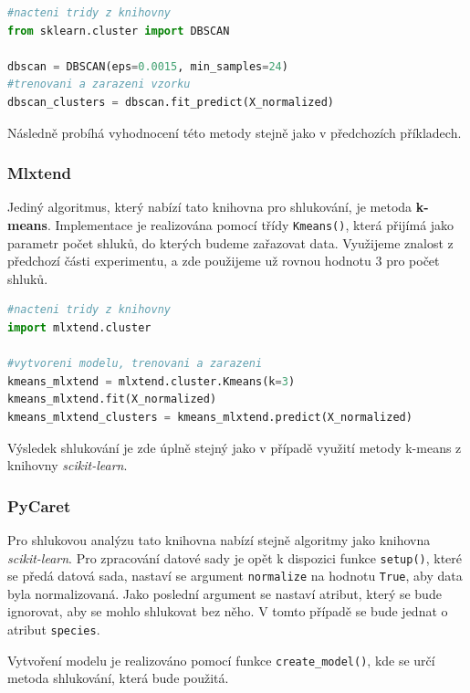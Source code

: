 \begin{mdframed}
\begin{lstlisting}[language=Python]
#nacteni tridy z knihovny
from sklearn.cluster import DBSCAN

dbscan = DBSCAN(eps=0.0015, min_samples=24)
#trenovani a zarazeni vzorku
dbscan_clusters = dbscan.fit_predict(X_normalized)
\end{lstlisting}   
\end{mdframed}
Následně probíhá vyhodnocení této metody stejně jako v předchozích příkladech.

\subsubsection*{Mlxtend}
Jediný algoritmus, který nabízí tato knihovna pro shlukování, je metoda \textbf{k-means}. Implementace je realizována pomocí třídy \verb|Kmeans()|, která přijímá jako parametr počet shluků, do kterých budeme zařazovat data. Využijeme znalost z předchozí části experimentu, a zde použijeme už rovnou hodnotu 3 pro počet shluků. 

\begin{mdframed}
\begin{lstlisting}[language=Python]
#nacteni tridy z knihovny
import mlxtend.cluster

#vytvoreni modelu, trenovani a zarazeni
kmeans_mlxtend = mlxtend.cluster.Kmeans(k=3)
kmeans_mlxtend.fit(X_normalized)
kmeans_mlxtend_clusters = kmeans_mlxtend.predict(X_normalized)
\end{lstlisting}   
\end{mdframed}

Výsledek shlukování je zde úplně stejný jako v případě využití metody k-means z knihovny \textit{scikit-learn}.

\subsubsection*{PyCaret}
Pro shlukovou analýzu tato knihovna nabízí stejně algoritmy jako knihovna \textit{scikit-learn}. Pro zpracování datové sady je opět k dispozici funkce \verb|setup()|, které se předá datová sada, nastaví se argument \verb|normalize| na hodnotu \verb|True|, aby data byla normalizovaná. Jako poslední argument se nastaví
atribut, který se bude ignorovat, aby se mohlo shlukovat bez něho. V tomto případě se bude jednat o atribut \verb|species|. 

Vytvoření modelu je realizováno pomocí funkce \verb|create_model()|, kde se určí metoda shlukování, která bude použitá. 

